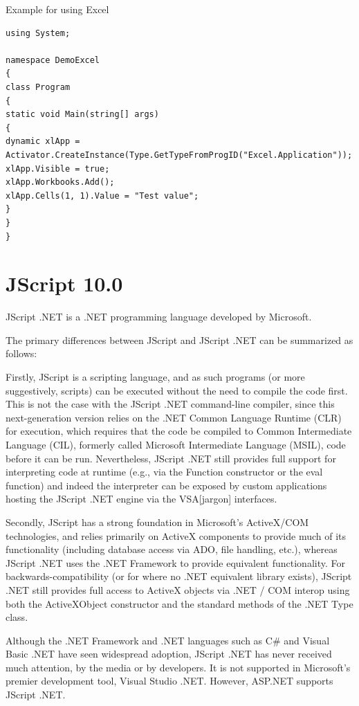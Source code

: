 \vpara
Example for using Excel

\begin{lstlisting}
using System;

namespace DemoExcel
{
class Program
{
static void Main(string[] args)
{
dynamic xlApp = Activator.CreateInstance(Type.GetTypeFromProgID("Excel.Application"));
xlApp.Visible = true;
xlApp.Workbooks.Add();
xlApp.Cells(1, 1).Value = "Test value";
}
}
}
\end{lstlisting}





\newpage
\section{JScript 10.0}
JScript .NET is a .NET programming language developed by Microsoft.

The primary differences between JScript and JScript .NET can be summarized as follows:

Firstly, JScript is a scripting language, and as such programs (or more suggestively, scripts) can be executed without the need to compile the code first. This is not the case with the JScript .NET command-line compiler, since this next-generation version relies on the .NET Common Language Runtime (CLR) for execution, which requires that the code be compiled to Common Intermediate Language (CIL), formerly called Microsoft Intermediate Language (MSIL), code before it can be run. Nevertheless, JScript .NET still provides full support for interpreting code at runtime (e.g., via the Function constructor or the eval function) and indeed the interpreter can be exposed by custom applications hosting the JScript .NET engine via the VSA[jargon] interfaces.

Secondly, JScript has a strong foundation in Microsoft's ActiveX/COM technologies, and relies primarily on ActiveX components to provide much of its functionality (including database access via ADO, file handling, etc.), whereas JScript .NET uses the .NET Framework to provide equivalent functionality. For backwards-compatibility (or for where no .NET equivalent library exists), JScript .NET still provides full access to ActiveX objects via .NET / COM interop using both the ActiveXObject constructor and the standard methods of the .NET Type class.

Although the .NET Framework and .NET languages such as C\# and Visual Basic .NET have seen widespread adoption, JScript .NET has never received much attention, by the media or by developers. It is not supported in Microsoft's premier development tool, Visual Studio .NET. However, ASP.NET supports JScript .NET.

